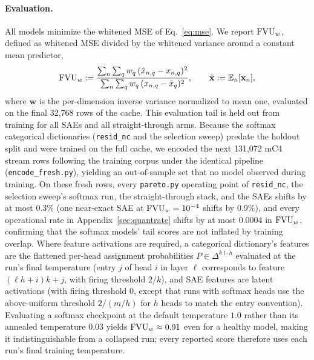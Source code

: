 \paragraph{Evaluation.}
All models minimize the whitened MSE of Eq.~\eqref{eq:mse}. We report
$\mathrm{FVU}_w$, defined as whitened MSE divided by the whitened variance around a
constant mean predictor,
\begin{equation}
	\mathrm{FVU}_w := \frac{\sum_{n} \sum_{q} w_q \,(\hat{x}_{n,q} - x_{n,q})^2}
	              {\sum_{n} \sum_{q} w_q \,(x_{n,q} - \bar{x}_q)^2},
	\qquad \bar{\mathbf{x}} := \mathbb{E}_n[\mathbf{x}_n],
	\label{eq:fvu}
\end{equation}
where $\mathbf{w}$ is the per-dimension inverse variance normalized to mean
one, evaluated on the final 32{,}768 rows of the cache. This evaluation
tail is held out from training for all SAEs and all straight-through arms.
Because the softmax categorical dictionaries (\texttt{resid\_nc} and the
selection sweep) predate the holdout split and were trained on the full
cache, we
encoded the next 131{,}072 mC4 stream rows following the training corpus
under the identical pipeline (\texttt{encode\_fresh.py}), yielding an
out-of-sample set that no model observed during training. On these fresh
rows, every \texttt{pareto.py} operating point of \texttt{resid\_nc}, the
selection sweep's softmax run, the straight-through stack, and the SAEs
shifts by at most 0.3\% (one near-exact SAE at $\mathrm{FVU}_w = 10^{-4}$ shifts by
0.9\%), and every operational rate in Appendix~\ref{sec:quantrate} shifts
by at most 0.0004 in $\mathrm{FVU}_w$, confirming that the softmax models' tail
scores are not inflated by training overlap. Where feature activations are
required, a categorical dictionary's features are the flattened per-head
assignment probabilities $P \in \Delta^{k}{}^{\,l\cdot h}$ evaluated at
the run's final temperature (entry $j$ of head $i$ in layer $\ell$ corresponds to
feature $(\ell h + i)k + j$, with firing threshold $2/k$), and SAE features
are latent activations (with firing threshold $0$, except that runs with
softmax heads use the above-uniform threshold $2/(m/h)$ for $h$ heads to
match the entry convention). Evaluating a softmax checkpoint at the default
temperature $1.0$ rather than its annealed temperature $0.03$ yields
$\mathrm{FVU}_w \approx 0.91$ even for a healthy model, making it indistinguishable
from a collapsed run; every reported score therefore uses each run's final
training temperature.

